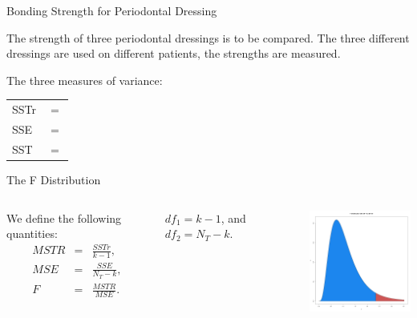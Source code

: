 \begin{frame}{Bonding Strength for Periodontal Dressing}

  The strength of three periodontal dressings is to be compared. The
  three different dressings are used on different patients, the
  strengths are measured.

  The three measures of variance: \\
  \begin{tabular}{ll}
    SSTr & $=$ \\
    SSE  & $=$ \\
    SST  & $=$  
  \end{tabular}


\end{frame}

\begin{frame}{The F Distribution}

  \begin{columns}

    We define the following quantities:
    \begin{eqnarray*}
      MSTR & = & \frac{SSTr}{k-1}, \\
      MSE  & = & \frac{SSE}{N_T - k}, \\
      F    & = & \frac{MSTR}{MSE}.
    \end{eqnarray*}

    $df_1=k-1$, and $df_2=N_T-k$.

  \vfill


    \vfill

    \centerline{\includegraphics[width=4cm]{img/FDistribution}}

    \vfill

    \end{columns}
  
\end{frame}




